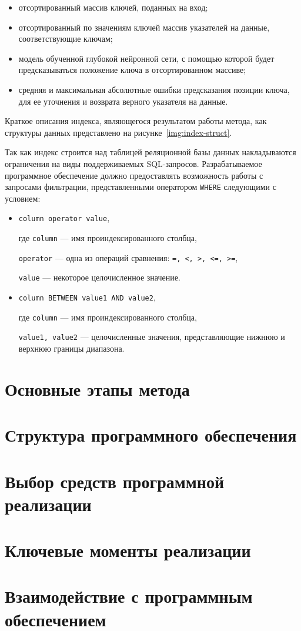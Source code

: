 \begin{itemize}
    \item отсортированный массив ключей, поданных на вход;
    \item отсортированный по значениям ключей массив указателей
        на данные, соответствующие ключам;
    \item модель обученной глубокой нейронной сети, с помощью которой будет
        предсказываться положение ключа в отсортированном массиве;
    \item средняя и максимальная абсолютные ошибки предсказания позиции ключа,
        для ее уточнения и возврата верного указателя на данные.
\end{itemize}

Краткое описания индекса, являющегося результатом работы метода, как структуры
данных представлено на рисунке~\ref{img:index-struct}.


Так как индекс строится над таблицей реляционной базы данных накладываются
ограничения на виды поддерживаемых SQL-запросов. Разрабатываемое программное
обеспечение должно предоставлять возможность работы с запросами фильтрации,
представленными оператором \texttt{WHERE} следующими с условием:

\begin{itemize}
    \item \texttt{column operator value},

        где \texttt{column} --- имя проиндексированного столбца,

        \texttt{operator} --- одна из операций сравнения: \texttt{=, <, >, <=, >=},

        \texttt{value} --- некоторое целочисленное значение.

    \item \texttt{column BETWEEN value1 AND value2},
        
        где \texttt{column} --- имя проиндексированного столбца,

        \texttt{value1, value2} --- целочисленные значения, представляющие
        нижнюю и верхнюю границы диапазона.
\end{itemize}

\section{Основные этапы метода}

\section{Структура программного обеспечения}

\section{Выбор средств программной реализации}

\section{Ключевые моменты реализации}

\section{Взаимодействие с программным обеспечением}

